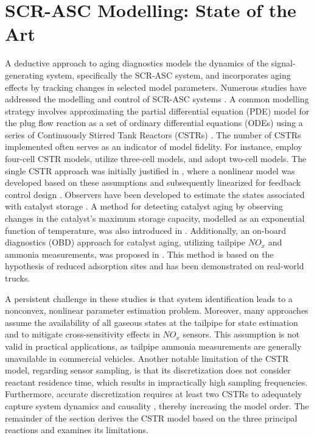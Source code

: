 \section{SCR-ASC Modelling: State of the Art}

A deductive approach to aging diagnostics models the dynamics of the signal-generating system, specifically the SCR-ASC
system, and incorporates aging effects by tracking changes in selected model parameters. Numerous studies have addressed
the modelling and control of SCR-ASC systems \cite{yuan2015diesel}. A common modelling strategy involves approximating the
partial differential equation (PDE) model for the plug flow reaction as a set of ordinary differential equations (ODEs)
using a series of Continuously Stirred Tank Reactors (CSTRs) \cite{hsieh2011development,nova2014urea}. The
number of CSTRs implemented often serves as an indicator of model fidelity. For instance, \cite{chen2016estimation,ma2017observer,devarakonda2009model,hsieh2011development} employ four-cell CSTR models,
\cite{hu2018failure,hu2017improving,stadlbauer2015adaptive,schar2004control} utilize three-cell
models, and \cite{jiang2019hydrothermal,upadhyay2002modeling,devarakonda2008adequacy} adopt two-cell
models. The single CSTR approach was initially justified in \cite{devarakonda2008adequacy}, where a nonlinear model was
developed based on these assumptions and subsequently linearized for feedback control design
\cite{devarakonda2009model}. Observers have been developed to estimate the states associated with catalyst storage
\cite{ma2017observer,jain2020term}. A method for detecting catalyst aging by observing changes in the
catalyst's maximum storage capacity, modelled as an exponential function of temperature, was also introduced in
\cite{ma2017observer,jiang2019hydrothermal}. Additionally, an on-board diagnostics (OBD) approach for
catalyst aging, utilizing tailpipe $NO_x$ and ammonia measurements, was proposed in \cite{matsumoto2016model}. This
method is based on the hypothesis of reduced adsorption sites and has been demonstrated on real-world trucks.

A persistent challenge in these studies is that system identification leads to a nonconvex, nonlinear parameter
estimation problem. Moreover, many approaches assume the availability of all gaseous states at the tailpipe for state
estimation and to mitigate cross-sensitivity effects in $NO_x$ sensors. This assumption is not valid in practical
applications, as tailpipe ammonia measurements are generally unavailable in commercial vehicles. Another notable
limitation of the CSTR model, regarding sensor sampling, is that its discretization does not consider reactant residence
time, which results in impractically high sampling frequencies. Furthermore, accurate discretization requires at least
two CSTRs to adequately capture system dynamics and causality \cite{charla2024reduced}, thereby increasing the model
order. The remainder of the section derives the CSTR model based on the three principal reactions and examines its
limitations.


